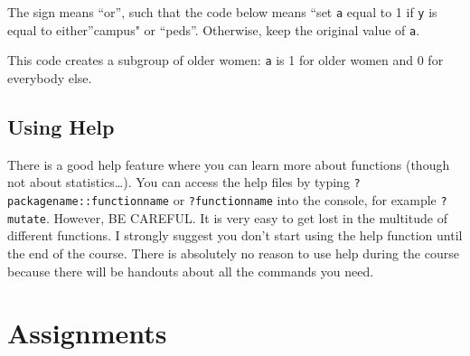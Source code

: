 \documentclass[]{book}
\newenvironment{Shaded}{\begin{snugshade}}{\end{snugshade}}
\newcommand{\DataTypeTok}[1]{\textcolor[rgb]{0.13,0.29,0.53}{#1}}
\newcommand{\DecValTok}[1]{\textcolor[rgb]{0.00,0.00,0.81}{#1}}
\newcommand{\KeywordTok}[1]{\textcolor[rgb]{0.13,0.29,0.53}{\textbf{#1}}}
\newcommand{\NormalTok}[1]{#1}
\newcommand{\OperatorTok}[1]{\textcolor[rgb]{0.81,0.36,0.00}{\textbf{#1}}}
\newcommand{\StringTok}[1]{\textcolor[rgb]{0.31,0.60,0.02}{#1}}
\begin{document}
The \texttt{\textbar{}} sign means ``or'', such that the code below means ``set \texttt{a} equal to 1 if \texttt{y} is equal to either''campus" or ``peds''. Otherwise, keep the original value of \texttt{a}.

\begin{Shaded}
\end{Shaded}

This code creates a subgroup of older women: \texttt{a} is 1 for older women and 0 for everybody else.

\begin{Shaded}
\end{Shaded}

\hypertarget{using-help}{%
\subsection{Using Help}\label{using-help}}

There is a good help feature where you can learn more about functions (though not about statistics\ldots). You can access the help files by typing \texttt{?packagename::functionname} or \texttt{?functionname} into the console, for example \texttt{?mutate}. However, BE CAREFUL. It is very easy to get lost in the multitude of different functions. I strongly suggest you don't start using the help function until the end of the course. There is absolutely no reason to use help during the course because there will be handouts about all the commands you need.

\hypertarget{assignments}{%
\section{Assignments}\label{assignments}}
\end{document}
